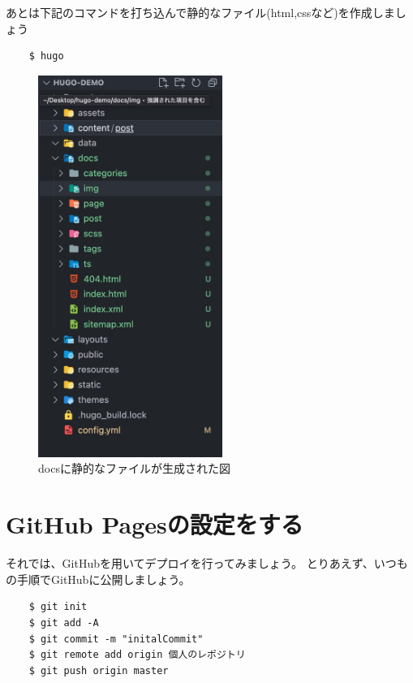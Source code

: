   あとは下記のコマンドを打ち込んで静的なファイル(html,cssなど)を作成しましょう


  \begin{shaded}
    \begin{verbatim}
    $ hugo
    \end{verbatim}
  \end{shaded}

  \begin{figure}[H]
    \centering
    \includegraphics[width=6cm]{./image/02-chap6/docs-genelate.png}
    \caption{docsに静的なファイルが生成された図}
    \label{chap6-docs-genelate-image}
  \end{figure}

\section{GitHub Pagesの設定をする}

  それでは、GitHubを用いてデプロイを行ってみましょう。
  とりあえず、いつもの手順でGitHubに公開しましょう。

  \begin{shaded}
    \begin{verbatim}
    $ git init
    $ git add -A
    $ git commit -m "initalCommit"
    $ git remote add origin 個人のレポジトリ
    $ git push origin master
    \end{verbatim}
  \end{shaded}


